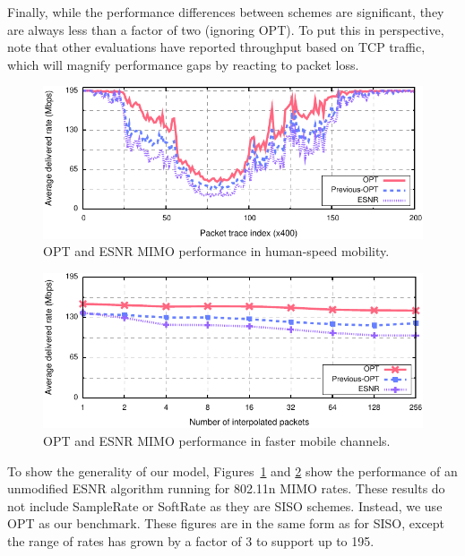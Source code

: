 Finally, while the performance differences between schemes are significant, they are always less than a factor of two (ignoring OPT). To put this in perspective, note that other evaluations have reported throughput based on TCP traffic, which will magnify performance gaps by reacting to packet loss.



\begin{figure}[t]
      \centering
      \includegraphics[width=\textwidth]{figures/rate/mimo_skip_time.pdf}
      \caption{\label{fig:mimo_eff_snr_time} OPT and ESNR MIMO performance in human-speed mobility.}
\end{figure}

\begin{figure}[ht]
      \centering
      \includegraphics[width=\textwidth]{figures/rate/mimo_rate_skip.pdf}
      \caption{\label{fig:mimo_eff_snr_speedup} OPT and ESNR MIMO performance in faster mobile channels.}
\end{figure}

To show the generality of our model, Figures~\ref{fig:mimo_eff_snr_time} and \ref{fig:mimo_eff_snr_speedup} show the performance of an unmodified ESNR algorithm running for 802.11n MIMO rates. These results do not include SampleRate or SoftRate as they are SISO schemes. Instead, we use OPT as our benchmark.
These figures are in the same form as for SISO, except the range of rates has grown by a factor of 3 to support up to 195\Mbps. 

